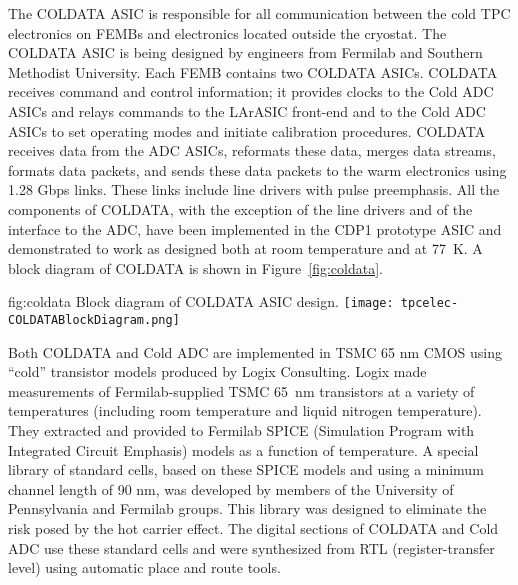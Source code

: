 The COLDATA ASIC is responsible for all communication between the cold TPC electronics on FEMBs and electronics located outside the cryostat.  The COLDATA ASIC is being designed by engineers from Fermilab and Southern Methodist University.  Each FEMB contains two COLDATA ASICs.  COLDATA receives command and control information; it provides clocks to the Cold ADC ASICs and relays commands to the LArASIC front-end and to the Cold ADC ASICs to set operating modes and initiate calibration procedures.  COLDATA receives data from the ADC ASICs, reformats these data, merges data streams, formats data packets, and sends these data packets to the warm electronics using 1.28 Gbps links.  These links include line drivers with pulse preemphasis.  All the components of COLDATA, with the exception of the line drivers and of the interface to the ADC, have been implemented in the CDP1 prototype ASIC and demonstrated to work as designed both at room temperature and at 77~K.  A block diagram of COLDATA is shown in Figure~\ref{fig:coldata}.  

\begin{dunefigure}
{fig:coldata}
{Block diagram of COLDATA ASIC design.}
\texttt{[image: tpcelec-COLDATABlockDiagram.png]}
\end{dunefigure}

Both COLDATA and Cold ADC are implemented in TSMC 65 nm CMOS using ``cold'' transistor models produced by Logix Consulting.  Logix made measurements of Fermilab-supplied TSMC 65~nm transistors at a variety of temperatures (including room temperature and liquid nitrogen temperature).  They extracted and provided to Fermilab SPICE (Simulation Program with Integrated Circuit Emphasis) models as a function of temperature.  A special library of standard cells, based on these SPICE models and using a minimum channel length of 90 nm, was developed by members of the University of Pennsylvania and Fermilab groups.  This library was designed to eliminate the risk posed by the hot carrier effect.  The digital sections of COLDATA and Cold ADC use these standard cells and were synthesized from RTL (register-transfer level) using automatic place and route tools.
